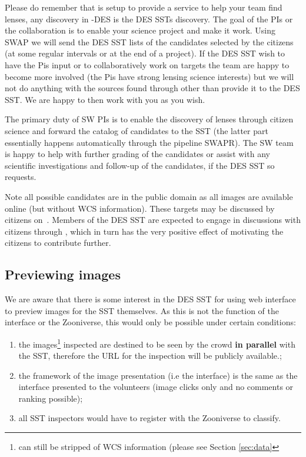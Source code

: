 \documentclass[a4paper,twocolumn]{article}
\begin{document}
Please do remember that \SW is setup to provide a service to help your team find lenses, any discovery in \SW-DES is the DES SSTs discovery. The goal of the \SW PIs or the \SW collaboration is to enable your science project and make it work. Using SWAP we will send the DES SST lists of the candidates selected by the citizens (at some regular intervals or at the end of a project). If the DES SST wish to have the \SW Pis input or to collaboratively work on targets the \SW team are happy to become more involved (the \SW Pis have strong lensing science interests) but we will not do anything with the sources found through \SW other than provide it to the DES SST.  We are happy to then work with you as you wish. 

The primary duty of SW PIs is to enable the discovery of lenses through citizen science and forward the catalog of candidates to the SST (the latter part essentially happens automatically through the pipeline SWAPR). The SW team is happy to help with further grading of the candidates or assist with any scientific investigations and follow-up of the candidates, if the DES SST so requests. 


Note all possible candidates are in the public domain as all images are available online (but without WCS information). These targets may be discussed by citizens on \SW\,\Talk. Members of the DES SST are expected to engage in discussions with citizens through \Talk, which in turn has the very positive effect of motivating the citizens to contribute further.

\subsection{Previewing images}
We are aware that there is some interest in the DES SST for using \SW web interface to preview images for the SST themselves. As this is not the function of the \SW interface or the Zooniverse, this would only be possible under certain conditions:
\begin{enumerate}[label=(\alph*)]
\item the images\footnote{can still be stripped of WCS information (please see Section \ref{sec:data}} inspected are destined to be seen by the crowd  \textbf{in parallel} with the SST, therefore the URL for the inspection will be publicly available.;
\item the framework of the image presentation (i.e the \SW interface) is the same as the interface presented to the volunteers (image clicks only and no comments or ranking possible);
\item all SST inspectors would have to register with the Zooniverse to classify.
\end{enumerate}
\end{document}
